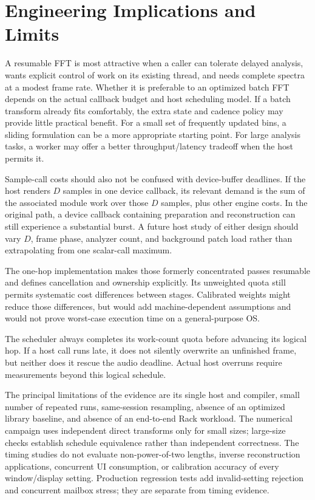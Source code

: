 \documentclass[11pt,letterpaper]{article}
\begin{document}
\section{Engineering Implications and Limits}
A resumable FFT is most attractive when a caller can tolerate delayed analysis,
wants explicit control of work on its existing thread, and needs complete
spectra at a modest frame rate. Whether it is preferable to an optimized batch
FFT depends on the actual callback budget and host scheduling model. If a
batch transform already fits comfortably, the extra state and cadence policy
may provide little practical benefit. For a small set of frequently updated
bins, a sliding formulation can be a more appropriate starting point. For
large analysis tasks, a worker may offer a better throughput/latency tradeoff
when the host permits it.

Sample-call costs should also not be confused with device-buffer deadlines.
If the host renders $D$ samples in one device callback, its relevant demand is
the sum of the associated module work over those $D$ samples, plus other engine
costs. In the original path, a device callback containing preparation and
reconstruction can still experience a substantial burst. A future host study
of either design should vary $D$, frame
phase, analyzer count, and background patch load rather than extrapolating
from one scalar-call maximum.

The one-hop implementation makes those formerly concentrated passes resumable
and defines cancellation and ownership explicitly. Its unweighted quota still
permits systematic cost differences between stages. Calibrated weights might
reduce those differences, but would add machine-dependent assumptions and
would not prove worst-case execution time on a general-purpose OS.

The scheduler always completes its work-count quota before advancing its
logical hop. If a host call runs late, it does not silently overwrite an
unfinished frame, but neither does it rescue the audio deadline. Actual host
overruns require measurements beyond this logical schedule.

The principal limitations of the evidence are its single host and compiler,
small number of repeated runs, same-session resampling, absence of an optimized
library baseline, and absence of an end-to-end Rack workload. The numerical
campaign uses independent direct transforms only for small sizes; large-size
checks establish schedule equivalence rather than independent correctness.
The timing studies do not evaluate non-power-of-two lengths, inverse
reconstruction applications, concurrent UI consumption, or calibration accuracy
of every window/display setting. Production regression tests add invalid-setting
rejection and concurrent mailbox stress; they are separate from timing evidence.
\end{document}
